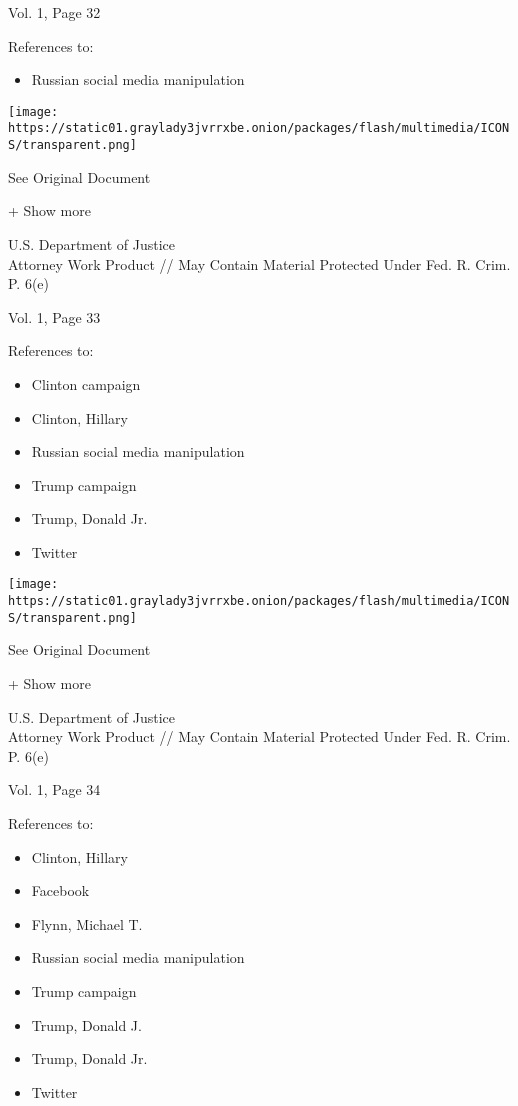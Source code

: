 Vol. 1, Page 32

References to:

\begin{itemize}
\tightlist
\item
  Russian social media manipulation
\end{itemize}

\protect\hyperlink{}{}

\texttt{[image: https://static01.graylady3jvrrxbe.onion/packages/flash/multimedia/ICONS/transparent.png]}

See Original Document

+ Show more

U.S. Department of Justice\\
Attorney Work Product // May Contain Material Protected Under Fed. R.
Crim. P. 6(e)

Vol. 1, Page 33

References to:

\begin{itemize}
\tightlist
\item
  Clinton campaign
\item
  Clinton, Hillary
\item
  Russian social media manipulation
\item
  Trump campaign
\item
  Trump, Donald Jr.
\item
  Twitter
\end{itemize}

\protect\hyperlink{}{}

\texttt{[image: https://static01.graylady3jvrrxbe.onion/packages/flash/multimedia/ICONS/transparent.png]}

See Original Document

+ Show more

U.S. Department of Justice\\
Attorney Work Product // May Contain Material Protected Under Fed. R.
Crim. P. 6(e)

Vol. 1, Page 34

References to:

\begin{itemize}
\tightlist
\item
  Clinton, Hillary
\item
  Facebook
\item
  Flynn, Michael T.
\item
  Russian social media manipulation
\item
  Trump campaign
\item
  Trump, Donald J.
\item
  Trump, Donald Jr.
\item
  Twitter
\end{itemize}

